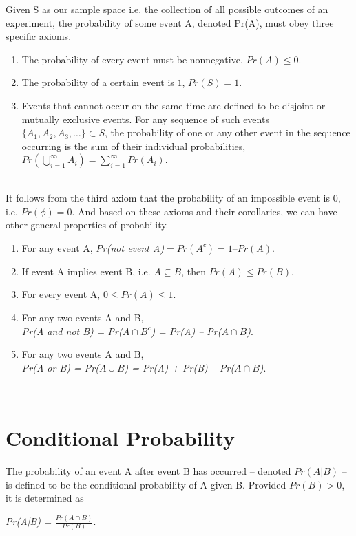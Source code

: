 \documentclass[12pt,twoside]{reedthesis}
\begin{document}
Given S as our sample space i.e. the collection of all possible outcomes of an experiment, the probability of some event A, denoted Pr(A), must obey three specific axioms.

\begin{enumerate}
\item The probability of every event must be nonnegative, $Pr(A)\leq0$.
\item The probability of a certain event is $1$, $Pr(S)=1$. 
\item Events that cannot occur on the same time are defined to be disjoint or mutually exclusive events. For any sequence of such events $ \{A_1, A_2, A_3, \dots\}\subset S$, the probability of one or any other event in the sequence occurring is the sum of their individual probabilities, $ Pr(⁡\bigcup\limits_{i=1}^{\infty} A_{i})=\sum\limits_{i=1}^{\infty}Pr(A_i)$.
\end{enumerate}\\

It follows from the third axiom that the probability of an impossible event is 0, i.e. $Pr(\phi)=0$. And based on these axioms and their corollaries, we can have other general properties of probability.

\begin{enumerate}
\item For any event A, \textit{Pr(not event A)}$=Pr(A^c)=1–Pr(A)$.
\item If event A implies event B, i.e. $A\subseteq B$, then $Pr(A)\leq Pr(B)$. 
\item For every event A, $0\leq Pr(A)\leq 1$.
\item For any two events A and B, \\ \textit{Pr(A and not B) = Pr($A\cap B^c$) = Pr(A) – Pr($A\cap B$)}.
\item For any two events A and B, \\ \textit{Pr(A or B) = Pr($A\cup B$) =  Pr(A) + Pr(B) – Pr($A\cap B$)}.
\end{enumerate}\\

\section{Conditional Probability}

The probability of an event A after event B has occurred – denoted $Pr(A|B)$ – is defined to be the conditional probability of A given B. Provided $Pr(B) > 0$, it is determined as
\begin{center} 
\textit{Pr(A|B) = $\frac{Pr(A \cap  B)}{Pr(B)}$}. 
\end{center} \\
\end{document}
